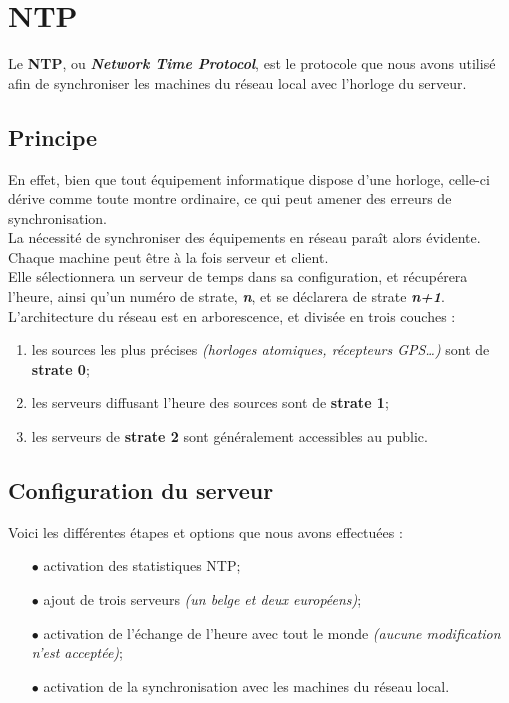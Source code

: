 \section{NTP}
\label{sec:ntp}

Le \textbf{NTP}, ou \textit{\textbf{Network Time Protocol}}, est le protocole que nous
avons utilisé afin de synchroniser les machines du réseau local avec l'horloge
du serveur.


\subsection{Principe}
\label{subsec:principe}

En effet, bien que tout équipement informatique dispose d'une horloge, celle-ci
dérive comme toute montre ordinaire, ce qui peut amener des erreurs de
synchronisation. \\
La nécessité de synchroniser des équipements en réseau paraît alors évidente. \\

Chaque machine peut être à la fois serveur et client.\\
Elle sélectionnera un serveur de temps dans sa configuration, et récupérera
l'heure, ainsi qu'un numéro de strate, \textit{\textbf{n}}, et se déclarera
de strate \textit{\textbf{n+1}}.\\

L'architecture du réseau est en arborescence, et divisée en trois couches :
\begin{enumerate}

    \item les sources les plus précises \textit{(horloges atomiques,
    récepteurs GPS…)} sont de \textbf{strate 0};
    \item les serveurs diffusant l'heure des sources sont de \textbf{strate 1};
    \item les serveurs de \textbf{strate 2} sont généralement accessibles au public.

\end{enumerate}


\subsection{Configuration du serveur}
\label{subsec:configuration-serveur}

Voici les différentes étapes et options que nous avons effectuées :
\begin{itemize}

    \item[$\bullet$] activation des statistiques NTP;
    \item[$\bullet$] ajout de trois serveurs \textit{(un belge et deux européens)};
    \item[$\bullet$] activation de l'échange de l'heure avec tout le monde
    \textit{(aucune modification n'est acceptée)};
    \item[$\bullet$] activation de la synchronisation avec les machines du
    réseau local.

\end{itemize}


